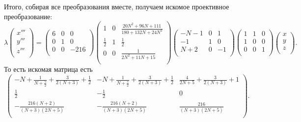 \documentclass[a4paper,12pt]{article}
\theoremstyle{definition}
\begin{document}
    Итого, собирая все преобразования вместе, получаем искомое проективное
    преобразование:
    \[
        \lambda \begin{pmatrix}
            x''' \\
            y''' \\
            z''' \\
        \end{pmatrix} = 
        \begin{pmatrix}
            6 & 0 & 0 \\
            0 & 1 & 0 \\
            0 & 0 & -216 \\
        \end{pmatrix}
        \begin{pmatrix}
            1 & 0 & \frac{20 N^2 + 96 N + 111}{180 + 132 N + 24 N^2} \\
            \frac{1}{2} & 1 & \frac{1}{2} \\
            0 & 0 & \frac{1}{2 N^2 + 11 N + 15} \\
        \end{pmatrix}
        \begin{pmatrix}
            -N - 1 & 0 & 1 \\
            -1 & 1 & 0 \\
            N + 2 & 0 & -1 \\
        \end{pmatrix}
        \begin{pmatrix}
            1 & 1 & 0 \\
            1 & 0 & 0 \\
            0 & 0 & 1 \\
        \end{pmatrix}
        \begin{pmatrix}
            x \\
            y \\
            z \\
        \end{pmatrix}
    .\] 
    То есть искомая матрица есть
    \[
    \begin{pmatrix}
     -N + \frac{1}{N + \frac{5}{2}} + \frac{3}{2
   (N + 3)} + \frac{1}{2} &
   -N + \frac{1}{N + \frac{5}{2}} + \frac{3}{2
   (N + 3)} + \frac{1}{2} & \frac{4}{2 N + 5} + \frac{3}{2
   (N + 3)} + 1 \\
 \frac{1}{2} & -\frac{1}{2} & 0 \\
 -\frac{216 (N + 2)}{(N + 3) (2 N + 5)} & -\frac{216
   (N + 2)}{(N + 3) (2 N + 5)} & \frac{216}{(N + 3) (2 N + 5)}
   \\
    \end{pmatrix}
    .\] 
\end{document}
